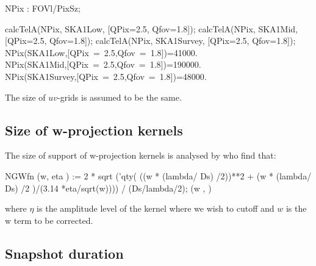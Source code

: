 \documentclass[useAMS,usenatbib,referee]{article}
\begin{document}
\begin{maxima}[]
NPix : FOVl/PixSz; 

calcTelA(NPix, SKA1Low, [QPix=2.5, Qfov=1.8]);
calcTelA(NPix, SKA1Mid, [QPix=2.5, Qfov=1.8]);
calcTelA(NPix, SKA1Survey, [QPix=2.5, Qfov=1.8]);
\maximaoutput*
{} \\
\m  \mbox{{}NPix(SKA1Low,[QPix = 2.5,Qfov = 1.8]){}}={{41000.\,}} \\
\m  \mbox{{}NPix(SKA1Mid,[QPix = 2.5,Qfov = 1.8]){}}={{190000.\,}} \\
\m  \mbox{{}NPix(SKA1Survey,[QPix = 2.5,Qfov = 1.8]){}}={{48000.\,}} \\
\end{maxima}

The size of $uv$-grids is assumed to be the same. 

\subsection{Size of w-projection kernels}

The size of support of w-projection kernels is analysed by
\cite{Mitchell2014} who find that:
\begin{maxima}[]
NGWfn (w, eta )  := 2 * sqrt ('qty( ((w * (lambda/ Ds) /2))**2 + (w * (lambda/ Ds) /2 )/(3.14 *eta/sqrt(w))))  / (Ds/lambda/2);
\maximaoutput*
\m  {}\left(w , \eta\right) \\
\end{maxima}
where $\eta$ is the amplitude level of the kernel where we wish to
cutoff and $w$ is the w term to be corrected. 

\subsection{Snapshot duration}
\end{document}

